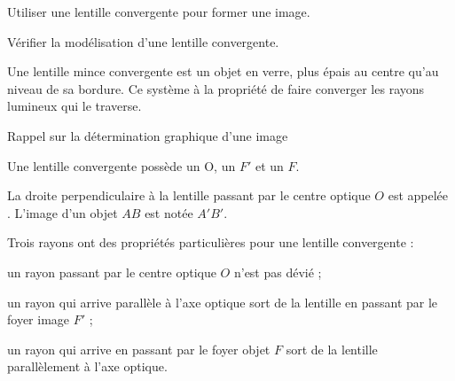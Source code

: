 \sndEnTeteQuatre

\vspace*{-36pt}


\begin{objectifs}
  \item Utiliser une lentille convergente pour former une image.
  \item Vérifier la modélisation d'une lentille convergente.
\end{objectifs}

\begin{contexte}
  Une lentille mince convergente est un objet en verre, plus épais au centre qu'au niveau de sa bordure.
  Ce système à la propriété de faire converger les rayons lumineux qui le traverse.
  
\end{contexte}
\bigskip


\begin{doc}{Rappel sur la détermination graphique d'une image}
  \label{doc:formation image}
  \vspace*{-24pt}
  
  \begin{encart}
    Une lentille convergente possède un  O, un  $F'$ et un  $F$.
  \end{encart}
  La droite perpendiculaire à la lentille passant par le centre optique $O$ est appelée .
  L'image d'un objet $AB$ est notée $A'B'$.
  
  \begin{center}
  \end{center}
  
  \begin{encart}
    Trois rayons ont des propriétés particulières pour une lentille convergente :
    \begin{listePoints}
      \item un rayon passant par le centre optique $O$ n'est pas dévié ;
      \item un rayon qui arrive parallèle à l'axe optique sort de la lentille en passant par le foyer image $F'$ ;
      \item un rayon qui arrive en passant par le foyer objet $F$ sort de la lentille parallèlement à l'axe optique.
    \end{listePoints}
  \end{encart}
\end{doc}

